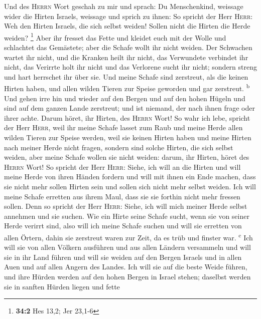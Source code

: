  Und des \textsc{Herrn} Wort geschah zu mir und sprach:
 Du Menschenkind, weissage wider die Hirten Israels,
weissage und sprich zu ihnen: So spricht der Herr \textsc{Herr}: Weh den
Hirten Israels, die sich selbst weiden! Sollen nicht die Hirten die
Herde weiden? \footnote{\textbf{34:2} Hes 13,2; Jer 23,1-6}
 Aber ihr fresset das Fette und kleidet euch mit der Wolle
und schlachtet das Gemästete; aber die Schafe wollt ihr nicht weiden.
 Der Schwachen wartet ihr nicht, und die Kranken heilt ihr
nicht, das Verwundete verbindet ihr nicht, das Verirrte holt ihr nicht
und das Verlorene sucht ihr nicht; sondern streng und hart herrschet ihr
über sie.  Und meine Schafe sind zerstreut, als die keinen
Hirten haben, und allen wilden Tieren zur Speise geworden und gar
zerstreut. \textsuperscript{b}  Und gehen irre hin und
wieder auf den Bergen und auf den hohen Hügeln und sind auf dem ganzen
Lande zerstreut; und ist niemand, der nach ihnen frage oder ihrer achte.
 Darum höret, ihr Hirten, des \textsc{Herrn} Wort!
 So wahr ich lebe, spricht der Herr \textsc{Herr}, weil
ihr meine Schafe lasset zum Raub und meine Herde allen wilden Tieren zur
Speise werden, weil sie keinen Hirten haben und meine Hirten nach meiner
Herde nicht fragen, sondern sind solche Hirten, die sich selbst weiden,
aber meine Schafe wollen sie nicht weiden:  darum, ihr
Hirten, höret des \textsc{Herrn} Wort!  So spricht der
Herr \textsc{Herr}: Siehe, ich will an die Hirten und will meine Herde
von ihren Händen fordern und will mit ihnen ein Ende machen, dass sie
nicht mehr sollen Hirten sein und sollen sich nicht mehr selbst weiden.
Ich will meine Schafe erretten aus ihrem Maul, dass sie sie forthin
nicht mehr fressen sollen.  Denn so spricht der Herr
\textsc{Herr}: Siehe, ich will mich meiner Herde selbst annehmen und sie
suchen.  Wie ein Hirte seine Schafe sucht, wenn sie von
seiner Herde verirrt sind, also will ich meine Schafe suchen und will
sie erretten von allen Örtern, dahin sie zerstreut waren zur Zeit, da es
trüb und finster war. \textsuperscript{c}  Ich will sie
von allen Völkern ausführen und aus allen Ländern versammeln und will
sie in ihr Land führen und will sie weiden auf den Bergen Israels und in
allen Auen und auf allen Angern des Landes.  Ich will sie
auf die beste Weide führen, und ihre Hürden werden auf den hohen Bergen
in Israel stehen; daselbst werden sie in sanften Hürden liegen und fette

